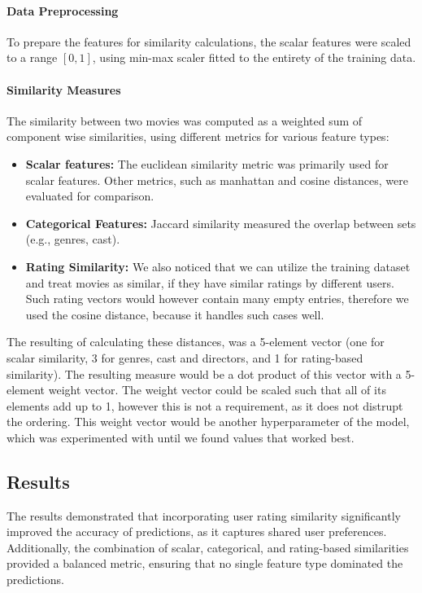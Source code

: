 \documentclass[a4paper,9pt]{article}
\begin{document}
\paragraph{Data Preprocessing}
To prepare the features for similarity calculations, the scalar features were scaled to a range $[0,1]$, using min-max scaler fitted to the entirety of the training data.

\paragraph{Similarity Measures}
The similarity between two movies was computed as a weighted sum of component wise similarities,
using different metrics for various feature types:

\begin{itemize}
	\item \textbf{Scalar features:} The euclidean similarity metric was primarily used for scalar features. Other metrics, such as manhattan and cosine distances, were evaluated for comparison.
	\item \textbf{Categorical Features:} Jaccard similarity measured the overlap between sets (e.g., genres, cast).
	\item \textbf{Rating Similarity:} We also noticed that we can utilize the training dataset and treat movies as similar, if they have similar ratings by different users. Such rating vectors would however contain many empty entries, therefore we used the cosine distance, because it handles such cases well.
\end{itemize}

The resulting of calculating these distances, was a 5-element vector (one for scalar similarity, 3 for genres, cast and directors, and 1 for rating-based similarity).
The resulting measure would be a dot product of this vector with a 5-element weight vector.
The weight vector could be scaled such that all of its elements add up to 1, however this is not a requirement, as it does not distrupt the ordering.
This weight vector would be another hyperparameter of the model, which was experimented with until we found values that worked best.

\subsection{Results}
The results demonstrated that incorporating user rating similarity significantly improved the accuracy of predictions, as it captures shared user preferences. Additionally, the combination of scalar, categorical, and rating-based similarities provided a balanced metric, ensuring that no single feature type dominated the predictions.
\end{document}
